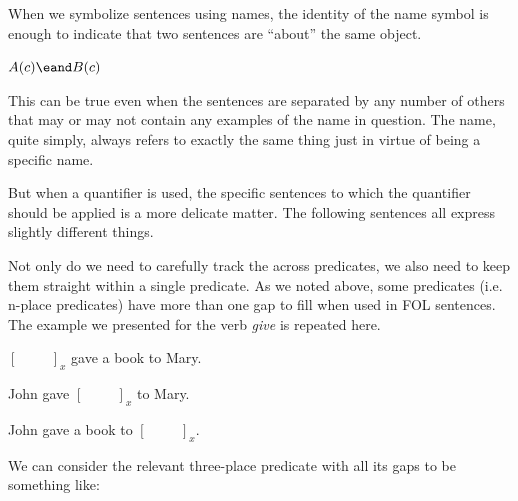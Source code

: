 When we symbolize sentences using names, the identity of the name symbol is
enough to indicate that two sentences are ``about'' the same object.

\begin{argument}
  \item[ ] $A(c)\eand B(c)$
\end{argument}

This can be true even when the sentences are separated by any number of others
that may or may not contain any examples of the name in question. The name,
quite simply, always refers to exactly the same thing just in virtue of being a
specific name. 

But when a quantifier is used, the specific sentences to which the quantifier
should be applied is a more delicate matter. The following sentences all express
slightly different things.



Not only do we need to carefully track the across predicates, we also need to
keep them straight within a single predicate. As we noted above, some predicates
(i.e. n-place predicates) have more than one gap to fill when used in FOL
sentences. The example we presented for the verb \emph{give} is repeated here.

\begin{argument}
\item[ ] $[\hspace{1cm}]_x$ gave a book to Mary.
\item[ ] John gave $[\hspace{1cm}]_x$ to Mary.
\item[ ] John gave a book to $[\hspace{1cm}]_x$.  
\end{argument}

We can consider the relevant three-place predicate with all its gaps to be
something like:


